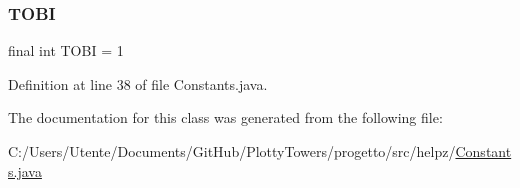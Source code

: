 \subsubsection{\texorpdfstring{T\+O\+BI}{TOBI}}
{\footnotesize\ttfamily final int T\+O\+BI = 1\hspace{0.3cm}{\ttfamily [static]}}



Definition at line 38 of file Constants.\+java.



The documentation for this class was generated from the following file\+:\begin{DoxyCompactItemize}
\item 
C\+:/\+Users/\+Utente/\+Documents/\+Git\+Hub/\+Plotty\+Towers/progetto/src/helpz/\hyperlink{_constants_8java}{Constants.\+java}\end{DoxyCompactItemize}
